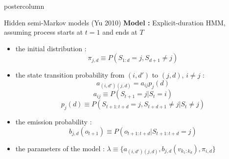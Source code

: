 \documentclass[final,hyperref={pdfpagelabels=false}]{beamer}
\begin{document}
\begin{frame}
\begin{columns}
\begin{column}{.50\textwidth}
\begin{beamercolorbox}[center,wd=\textwidth]{postercolumn}
\begin{minipage}[T]{.98\textwidth}
{\begin{block}{Hidden semi-Markov models (Yu 2010)}
                \vskip0.5cm
                \textbf{Model :} Explicit-duration HMM, assuming process starts at $t=1$ and ends at $T$
                \vskip0cm
                \begin{itemize}
                    \item[\bullet] the initial distribution :
                    $$\pi_{j,d} \equiv P(S_{1:d} = j, S_{d+1} \neq j)$$
                    \item[\bullet] the state transition probability from $(i,d')$ to $(j,d)$, $i \neq j$ :
                    $$a_{(i,d')(j,d)}=a_{ij}p_j(d)$$
                    $$a_{ij} \equiv P(S_{t+1} = j | S_t = i)$$
                    $$p_j(d) \equiv P(S_{t+1:t+d} = j, S_{t+d+1} \neq j | S_t \neq j)$$
                    \item[\bullet] the emission probability :
                    $$b_{j,d}(o_{t+1}) \equiv P(o_{t+1:t+d} | S_{t+1:t+d} = j)$$
                    \item[\bullet] the parameters of the model : $\lambda \equiv \{a_{(i,d')(j,d)},b_{j,d}(v_{k_1:k_d}), \pi_{i,d}\}$
                \end{itemize}

            \end{block}
          }
        \end{minipage}
      \end{beamercolorbox}
    \end{column}


\end{columns}
\end{frame}
\end{document}
